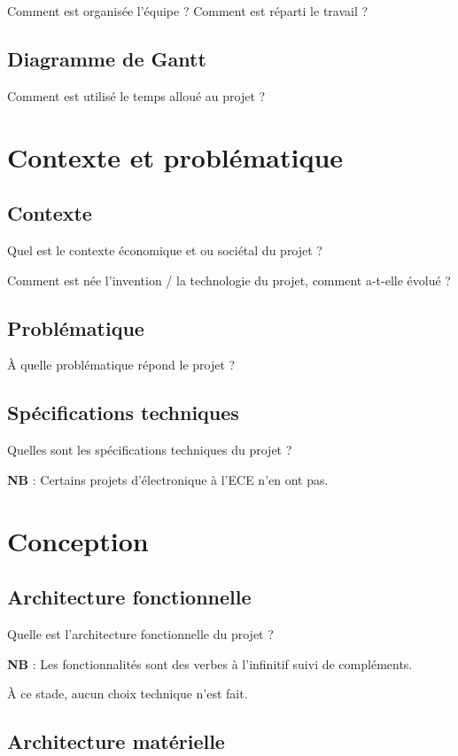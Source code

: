 \documentclass[a4paper,11pt]{article}
\begin{document}
Comment est organisée l’équipe ? Comment est réparti le travail ?

\subsection{Diagramme de Gantt}
Comment est utilisé le temps alloué au projet ?

\section{Contexte et problématique}
\subsection{Contexte}

Quel est le contexte économique et ou sociétal du projet ?

Comment est née l’invention / la technologie du projet, comment a-t-elle évolué ?

\subsection{Problématique}
		
À quelle problématique répond le projet ?
			
\subsection{Spécifications techniques}

Quelles sont les spécifications techniques du projet ?
			
\textbf{NB} : Certains projets d’électronique à l’ECE n’en ont pas.
			
\section{Conception}
\subsection{Architecture fonctionnelle}
		
Quelle est l’architecture fonctionnelle du projet ?
			
\textbf{NB} : Les fonctionnalités sont des verbes à l’infinitif suivi de compléments.
			
À ce stade, aucun choix technique n’est fait.
			
\subsection{Architecture matérielle}
			
\end{document}
